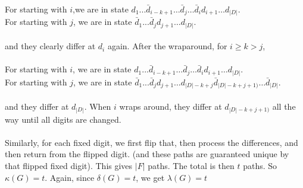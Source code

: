 \documentclass[letterpaper, 11pt]{article}
\newcommand{\1}{\mathds{1}}	%
\theoremstyle{definition}
\begin{document}
\\For starting with $i$,we are in state $d_1 ... \bar{d}_{i-k+1} \dots \bar{d}_j \dots \bar{d}_i d_{i+1} \dots d_{|D|}$. 
\\For starting with $j$, we are in state $\bar{d}_1 ... \bar{d}_j  d_{j+1} \dots d_{|D|}$.  
\\ ~\\and they clearly differ at $d_i$ again. After the wraparound, for $i \ge k > j$, \\~
\\For starting with $i$, we are in state $d_1 ... \bar{d}_{i-k+1} \dots \bar{d}_j \dots \bar{d}_i d_{i+1} \dots d_{|D|}$. 
\\For starting with $j$, we are in state $\bar{d}_1 ... \bar{d}_j  d_{j+1} \dots d_{|D| - k + j} \bar{d}_{|D| - k + j + 1)} \dots \bar{d}_{|D|}$.  \\ ~\\and they differ at $d_{|D|}$. When $i$ wraps around, they differ at $d_{|D| - k + j + 1)} $ all the way until all digits are changed. \\ ~\\
Similarly, for each fixed digit, we first flip that, then process the differences, and then return from the flipped digit. (and these paths are guaranteed unique by that flipped fixed digit). This gives $|F|$ paths. The total is then $t$ paths. So $\kappa (G) = t$. Again, since $\delta (G) = t$, we get $\lambda (G) = t$
\end{document}
